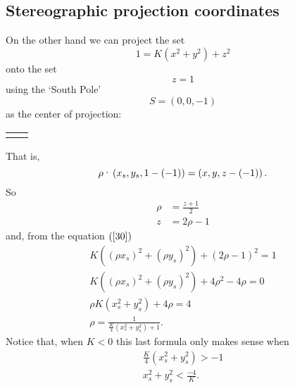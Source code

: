 
\subsection*{Stereographic projection coordinates}

On the other hand we can project the set
\[
1=K\left(  x^{2}+y^{2}\right)  +z^{2}%
\]
onto the set%
\[
z=1
\]
using the `South Pole'%
\[
S=\left(  0,0,-1\right)
\]
as the center of projection:%

\begin{tabular}
[c]{cc}%
{\includegraphics[
natheight=3.406500in,
natwidth=4.912100in,
height=1.9389in,
width=2.789in
]%
{MXAJBZ0M.jpg}%
}%
&
{\includegraphics[
natheight=4.263500in,
natwidth=4.889600in,
height=1.9415in,
width=2.226in
]%
{MXAJBZ0N.jpg}%
}%
\end{tabular}


That is,%
\[
\rho\text{\textperiodcentered}\left(  x_{s},y_{s},1-\left(  -1\right)
\right)  =\left(  x,y,z-\left(  -1\right)  \right)  .
\]
So%
\begin{align*}
\rho &  =\frac{z+1}{2}\\
z  &  =2\rho-1
\end{align*}
and, from the equation $\left(  \ref{30}\right)  $%
\begin{gather*}
K\left(  \left(  \rho x_{s}\right)  ^{2}+\left(  \rho y_{s}\right)
^{2}\right)  +\left(  2\rho-1\right)  ^{2}=1\\
K\left(  \left(  \rho x_{s}\right)  ^{2}+\left(  \rho y_{s}\right)
^{2}\right)  +4\rho^{2}-4\rho=0\\
\rho K\left(  x_{s}^{2}+y_{s}^{2}\right)  +4\rho=4\\
\rho=\frac{1}{\frac{K}{4}\left(  x_{s}^{2}+y_{s}^{2}\right)  +1}.
\end{gather*}
Notice that, when $K<0$ this last formula only makes sense when%
\begin{gather*}
\frac{K}{4}\left(  x_{s}^{2}+y_{s}^{2}\right)  >-1\\
x_{s}^{2}+y_{s}^{2}<\frac{-4}{K}.
\end{gather*}


